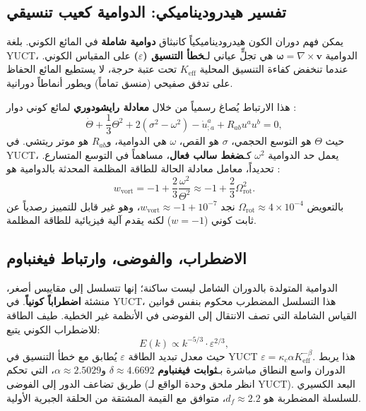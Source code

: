 \documentclass[12pt,a4paper]{article}
\begin{document}
	\subsection{تفسير هيدروديناميكي: الدوامية كعيب تنسيقي}
	
	يمكن فهم دوران الكون هيدروديناميكياً كانبثاق \textbf{دوامية شاملة} في المائع الكوني. بلغة YUCT، الدوامية \(\boldsymbol{\omega} = \nabla \times \mathbf{v}\) هي تجلٍّ عياني لـ\textbf{خطأ التنسيق (\(\varepsilon\))} على المقياس الكوني. عندما تنخفض كفاءة التنسيق المحلية \(K_{\mathrm{eff}}\) تحت عتبة حرجة، لا يستطيع المائع الحفاظ على تدفق صفيحي (منسق تماماً) ويطور أنماطاً دورانية.
	
	هذا الارتباط يُصاغ رسمياً من خلال \textbf{معادلة رايشودوري} لمائع كوني دوار \cite{Ellis1971}:
	\begin{equation}
		\dot{\Theta} + \frac{1}{3}\Theta^2 + 2(\sigma^2 - \omega^2) - \dot{u}^a_{;a} + R_{ab}u^a u^b = 0,
	\end{equation}
	حيث \(\Theta\) هو التوسع الحجمي، \(\sigma\) هو القص، \(\omega\) هي الدوامية، و\(R_{ab}\) هو موتر ريتشي. في YUCT، يعمل حد الدوامية \(\omega^2\) كـ\textbf{ضغط سالب فعال}، مساهماً في التوسع المتسارع. تحديداً، معامل معادلة الحالة للطاقة المظلمة المحدثة بالدوامية هو \cite{Tsagas2011}:
	\begin{equation}
		w_{\mathrm{vort}} = -1 + \frac{2}{3}\frac{\omega^2}{\Theta^2} \approx -1 + \frac{2}{3}\Omega_{\mathrm{rot}}^2.
	\end{equation}
	بالتعويض \(\Omega_{\mathrm{rot}} \approx 4 \times 10^{-4}\) نجد \(w_{\mathrm{vort}} \approx -1 + 10^{-7}\)، وهو غير قابل للتمييز رصدياً عن ثابت كوني (\(w = -1\)) لكنه يقدم آلية فيزيائية للطاقة المظلمة.
	
	\subsection{الاضطراب، والفوضى، وارتباط فيغنباوم}
	
	الدوامية المتولدة بالدوران الشامل ليست ساكنة؛ إنها تتسلسل إلى مقاييس أصغر، منشئة \textbf{اضطراباً كونياً}. في YUCT، هذا التسلسل المضطرب محكوم بنفس قوانين القياس الشاملة التي تصف الانتقال إلى الفوضى في الأنظمة غير الخطية. طيف الطاقة للاضطراب الكوني يتبع:
	\begin{equation}
		E(k) \propto k^{-5/3} \cdot \varepsilon^{2/3},
	\end{equation}
	حيث معدل تبديد الطاقة \(\varepsilon\) يُطابق مع خطأ التنسيق في YUCT \(\varepsilon = \kappa_c \alpha K_{\mathrm{eff}}^{-\beta}\). هذا يربط الدوران واسع النطاق مباشرة بـ\textbf{ثوابت فيغنباوم} \(\delta \approx 4.6692\) و\(\alpha \approx 2.5029\)، التي تحكم طريق تضاعف الدور إلى الفوضى (انظر ملحق وحدة الواقع لـ YUCT). البعد الكسيري للسلسلة المضطربة هو \(d_f \approx 2.2\)، متوافق مع القيمة المشتقة من الحلقة الجبرية الأولية.
	
\end{document}
